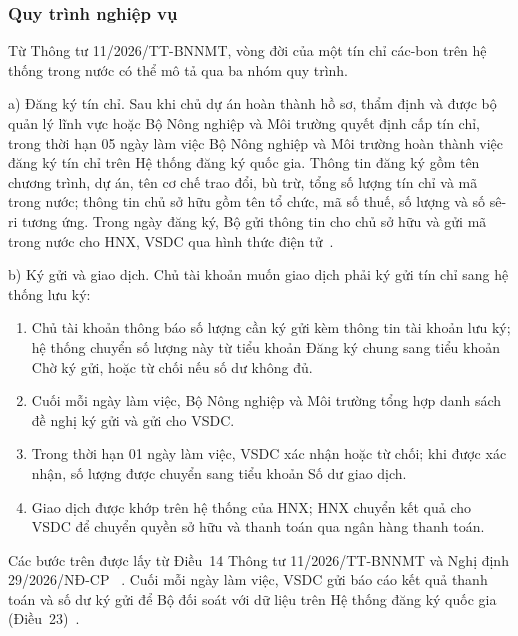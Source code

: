 \subsubsection*{Quy trình nghiệp vụ}

Từ Thông tư 11/2026/TT-BNNMT, vòng đời của một tín chỉ các-bon trên hệ thống trong nước có thể mô tả qua ba nhóm quy trình.

a) Đăng ký tín chỉ. Sau khi chủ dự án hoàn thành hồ sơ, thẩm định và được bộ quản lý lĩnh vực hoặc Bộ Nông nghiệp và Môi trường quyết định cấp tín chỉ, trong thời hạn 05 ngày làm việc Bộ Nông nghiệp và Môi trường hoàn thành việc đăng ký tín chỉ trên Hệ thống đăng ký quốc gia. Thông tin đăng ký gồm tên chương trình, dự án, tên cơ chế trao đổi, bù trừ, tổng số lượng tín chỉ và mã trong nước; thông tin chủ sở hữu gồm tên tổ chức, mã số thuế, số lượng và số sê-ri tương ứng. Trong ngày đăng ký, Bộ gửi thông tin cho chủ sở hữu và gửi mã trong nước cho HNX, VSDC qua hình thức điện tử~\cite{vietnam2026thongtu11}.

b) Ký gửi và giao dịch. Chủ tài khoản muốn giao dịch phải ký gửi tín chỉ sang hệ thống lưu ký:
\begin{enumerate}
    \item Chủ tài khoản thông báo số lượng cần ký gửi kèm thông tin tài khoản lưu ký; hệ thống chuyển số lượng này từ tiểu khoản Đăng ký chung sang tiểu khoản Chờ ký gửi, hoặc từ chối nếu số dư không đủ.
    \item Cuối mỗi ngày làm việc, Bộ Nông nghiệp và Môi trường tổng hợp danh sách đề nghị ký gửi và gửi cho VSDC.
    \item Trong thời hạn 01 ngày làm việc, VSDC xác nhận hoặc từ chối; khi được xác nhận, số lượng được chuyển sang tiểu khoản Số dư giao dịch.
    \item Giao dịch được khớp trên hệ thống của HNX; HNX chuyển kết quả cho VSDC để chuyển quyền sở hữu và thanh toán qua ngân hàng thanh toán.
\end{enumerate}
Các bước trên được lấy từ Điều~14 Thông tư 11/2026/TT-BNNMT và Nghị định 29/2026/NĐ-CP~\cite{vietnam2026thongtu11} \cite{vietnam2026nghidinh29}. Cuối mỗi ngày làm việc, VSDC gửi báo cáo kết quả thanh toán và số dư ký gửi để Bộ đối soát với dữ liệu trên Hệ thống đăng ký quốc gia (Điều~23)~\cite{vietnam2026thongtu11}.

